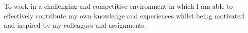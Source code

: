 To work in a challenging and competitive environment in which I am able to
effectively contribute my own knowledge and experiences whilst being motivated
and inspired by my colleagues and assignments.
